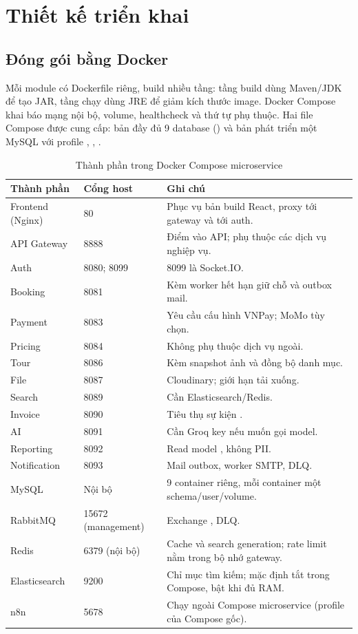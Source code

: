 \section{Thiết kế triển khai}
\label{sec:trien-khai}

\subsection{Đóng gói bằng Docker}

Mỗi module có Dockerfile riêng, build nhiều tầng: tầng build dùng Maven/JDK để tạo JAR, tầng chạy dùng JRE để giảm kích thước image. Docker Compose khai báo mạng nội bộ, volume, healthcheck và thứ tự phụ thuộc. Hai file Compose được cung cấp: bản đầy đủ 9 database () và bản phát triển một MySQL với profile , , .

\begin{table}[H]
\centering
\caption{Thành phần trong Docker Compose microservice}
\label{tab:compose}
\small
\begin{tabularx}{\textwidth}{@{}L{3.2cm}C{2.2cm}Y@{}}
\toprule
\textbf{Thành phần} & \textbf{Cổng host} & \textbf{Ghi chú}\\
\midrule
Frontend (Nginx) & 80 & Phục vụ bản build React, proxy  tới gateway và  tới auth.\\
API Gateway & 8888 & Điểm vào API; phụ thuộc các dịch vụ nghiệp vụ.\\
Auth & 8080; 8099 & 8099 là Socket.IO.\\
Booking & 8081 & Kèm worker hết hạn giữ chỗ và outbox mail.\\
Payment & 8083 & Yêu cầu cấu hình VNPay; MoMo tùy chọn.\\
Pricing & 8084 & Không phụ thuộc dịch vụ ngoài.\\
Tour & 8086 & Kèm snapshot ảnh và đồng bộ danh mục.\\
File & 8087 & Cloudinary; giới hạn tải xuống.\\
Search & 8089 & Cần Elasticsearch/Redis.\\
Invoice & 8090 & Tiêu thụ sự kiện .\\
AI & 8091 & Cần Groq key nếu muốn gọi model.\\
Reporting & 8092 & Read model , không PII.\\
Notification & 8093 & Mail outbox, worker SMTP, DLQ.\\
MySQL & Nội bộ & 9 container riêng, mỗi container một schema/user/volume.\\
RabbitMQ & 15672 (management) & Exchange , DLQ.\\
Redis & 6379 (nội bộ) & Cache và search generation; rate limit nằm trong bộ nhớ gateway.\\
Elasticsearch & 9200 & Chỉ mục tìm kiếm; mặc định tắt trong Compose, bật khi đủ RAM.\\
n8n & 5678 & Chạy ngoài Compose microservice (profile  của Compose gốc).\\
\bottomrule
\end{tabularx}
\end{table}

